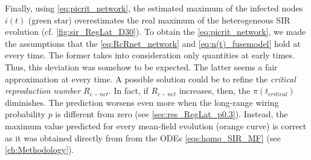 \documentclass[a4paper,10pt, oneside]{book} %
\theoremstyle{definition}
\begin{document}
Finally, using \autoref{eq:picrit_network}, the estimated maximum of the infected nodes $ i(t)$ (green star) overestimates the real maximum of the heterogeneous SIR evolution (cf. \autoref{fig:sir_RegLat_D30}). To obtain the \autoref{eq:picrit_network}, we made the assumptions that the \autoref{eq:RcRnet_network} and \autoref{eq:n(t)_fusemodel} hold at every time. The former takes into consideration only quantities at early times. Thus, this deviation was somehow to be expected. The latter seems a fair approximation at every time.
A possible solution could be to refine the \textit{critical reproduction number} $ R_{c-net}$. In fact, if $ R_{c-net}$ increases, then, the $ \pi(t_{critical})$ diminishes.   
The prediction worsens even more when the long-range wiring probability $ p$ is different from zero (see \autoref{sec:res_RegLat_p0.3}). 
Instead, the maximum value predicted for every mean-field evolution (orange curve) is correct as it was obtained directly from from the ODEs \autoref{eqs:homo_SIR_MF} (see \autoref{ch:Methodology}).
\end{document}
